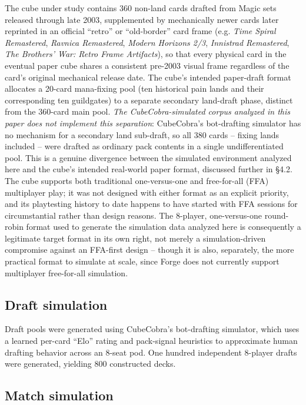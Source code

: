 \documentclass[11pt]{article}
\begin{document}
The cube under study contains 360 non-land cards drafted from Magic sets released
through late 2003, supplemented by mechanically newer cards later reprinted in an
official ``retro'' or ``old-border'' card frame (e.g. \emph{Time Spiral Remastered},
\emph{Ravnica Remastered}, \emph{Modern Horizons 2/3}, \emph{Innistrad Remastered},
\emph{The Brothers' War: Retro Frame Artifacts}), so that every physical card in the
eventual paper cube shares a consistent pre-2003 visual frame regardless of the
card's original mechanical release date. The cube's intended paper-draft format
allocates a 20-card mana-fixing pool (ten historical pain lands and their
corresponding ten guildgates) to a separate secondary land-draft phase, distinct
from the 360-card main pool. \emph{The CubeCobra-simulated corpus analyzed in this
paper does not implement this separation}: CubeCobra's bot-drafting simulator has
no mechanism for a secondary land sub-draft, so all 380 cards -- fixing lands
included -- were drafted as ordinary pack contents in a single undifferentiated
pool. This is a genuine divergence between the simulated environment analyzed here
and the cube's intended real-world paper format, discussed further in \S4.2. The cube supports both traditional one-versus-one and free-for-all (FFA)
multiplayer play; it was not designed with either format as an explicit priority,
and its playtesting history to date happens to have started with FFA sessions for
circumstantial rather than design reasons. The 8-player, one-versus-one
round-robin format used to generate the simulation data analyzed here is
consequently a legitimate target format in its own right, not merely a
simulation-driven compromise against an FFA-first design -- though it is also, separately,
the more practical format to simulate at scale, since Forge does not currently support
multiplayer free-for-all simulation.

\subsection{Draft simulation}

Draft pools were generated using CubeCobra's bot-drafting simulator, which uses a
learned per-card ``Elo'' rating and pack-signal heuristics to approximate human
drafting behavior across an 8-seat pod. One hundred independent 8-player drafts were
generated, yielding 800 constructed decks.

\subsection{Match simulation}
\end{document}
